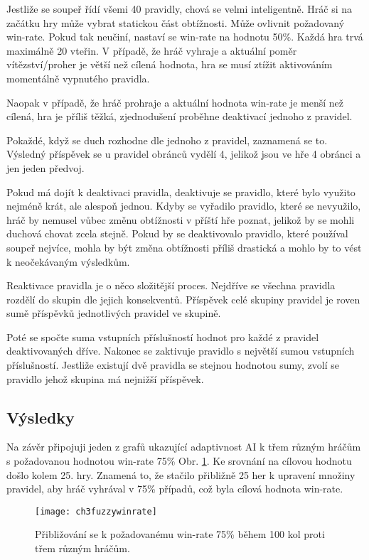 Jestliže se soupeř řídí všemi 40 pravidly, chová se velmi inteligentně. Hráč si na začátku hry může vybrat statickou část obtížnosti. Může ovlivnit požadovaný win-rate. Pokud tak neučiní, nastaví se win-rate na hodnotu 50\%. Každá hra trvá maximálně 20 vteřin. V případě, že hráč vyhraje a aktuální poměr vítězství/proher  je větší než cílená hodnota, hra se musí ztížit aktivováním momentálně vypnutého pravidla.

Naopak v případě, že hráč prohraje a aktuální hodnota win-rate je menší než cílená, hra je příliš těžká, zjednodušení proběhne deaktivací jednoho z pravidel.

Pokaždé, když se duch rozhodne dle jednoho z pravidel, zaznamená se to. Výsledný příspěvek se u pravidel obránců vydělí 4, jelikož jsou ve hře 4 obránci a jen jeden předvoj.

Pokud má dojít k deaktivaci pravidla, deaktivuje se pravidlo, které bylo využito nejméně krát, ale alespoň jednou. Kdyby se vyřadilo pravidlo, které se nevyužilo, hráč by nemusel vůbec změnu obtížnosti v příští hře poznat, jelikož by se mohli duchová chovat zcela stejně. Pokud by se deaktivovalo pravidlo, které používal soupeř nejvíce, mohla by být změna obtížnosti příliš drastická a mohlo by to vést k neočekávaným výsledkům.

Reaktivace pravidla je o něco složitější proces. Nejdříve se všechna pravidla rozdělí do skupin dle jejich konsekventů. Příspěvek celé skupiny pravidel je roven sumě příspěvků jednotlivých pravidel ve skupině. 

Poté se spočte suma vstupních příslušností hodnot pro každé z pravidel deaktivovaných dříve. Nakonec se zaktivuje pravidlo s největší sumou vstupních příslušností. Jestliže existují dvě pravidla se stejnou hodnotou sumy, zvolí se pravidlo jehož skupina má nejnižší příspěvek.

\subsection{Výsledky}

Na závěr připojuji jeden z grafů ukazující adaptivnost AI k třem různým hráčům s požadovanou hodnotou win-rate 75\% Obr. \ref{fig-ch3fuzzywinrate}. Ke srovnání na cílovou hodnotu došlo kolem 25. hry. Znamená to, že stačilo přibližně 25 her k upravení množiny pravidel, aby hráč vyhrával v 75\% případů, což byla cílová hodnota win-rate.

\begin{figure}
  \centering
  \texttt{[image: ch3fuzzywinrate]}
	\caption{Přibližování se k požadovanému win-rate 75\% během 100 kol proti třem různým hráčům. \cite{25deadend} }
	\label{fig-ch3fuzzywinrate}
\end{figure}

